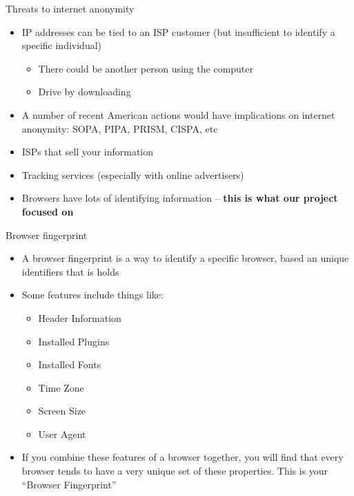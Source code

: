 \begin{frame}[fragile,t]{Threats to internet anonymity}
	\begin{itemize}
		\item IP addresses can be tied to an ISP customer (but insufficient to identify a specific individual)
		\begin{itemize}
			\item There could be another person using the computer
			\item Drive by downloading
		\end{itemize}
		\item A number of recent American actions would have implications on internet anonymity: SOPA, PIPA, PRISM, CISPA, etc
		\item ISPs that sell your information
		\item Tracking services (especially with online advertisers)
		\item Browsers have lots of identifying information -- \textbf{this is what our project focused on}
	\end{itemize}
\end{frame}

\begin{frame}[fragile,t]{Browser fingerprint}
	\begin{itemize}
		\item A browser fingerprint is a way to identify a specific browser, based an unique identifiers that is holds
		\item Some features include things like:
		\begin{itemize}
			\item Header Information
			\item Installed Plugins
			\item Installed Fonts
			\item Time Zone
			\item Screen Size
			\item User Agent
		\end{itemize}
		\item If you combine these features of a browser together, you will find that every browser tends to have a very unique set of these properties. This is your ``Browser Fingerprint''
	\end{itemize}
\end{frame}

